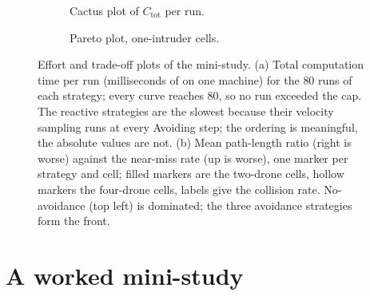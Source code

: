 \begin{figure}[tb]
  \centering
  \begin{subfigure}[b]{0.49\textwidth}\centering
    \caption{Cactus plot of $C_{\mathrm{tot}}$ per run.}
    \label{fig:ch25-cactus}
  \end{subfigure}\hfill
  \begin{subfigure}[b]{0.49\textwidth}\centering
    \caption{Pareto plot, one-intruder cells.}
    \label{fig:ch25-pareto}
  \end{subfigure}
  \caption{Effort and trade-off plots of the mini-study. (a) Total
  computation time per run (milliseconds of \python on one machine) for the
  $80$ runs of each strategy; every curve reaches $80$, so no run exceeded
  the cap. The reactive strategies are the slowest because their velocity
  sampling runs at every Avoiding step; the ordering is meaningful, the
  absolute values are not. (b) Mean path-length ratio (right is worse)
  against the near-miss rate (up is worse), one marker per strategy and
  cell; filled markers are the two-drone cells, hollow markers the
  four-drone cells, labels give the collision rate. No-avoidance (top left)
  is dominated; the three avoidance strategies form the front.}
  \label{fig:ch25-plots}
\end{figure}

\section{A worked mini-study}
\label{sec:ch25-study}

